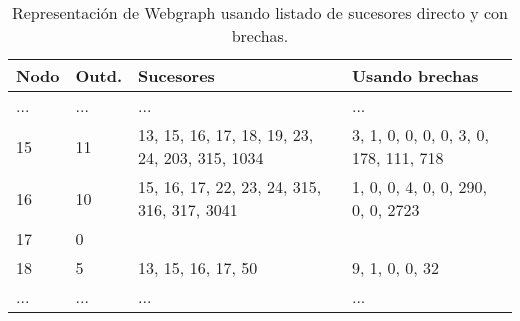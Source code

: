  \begin{table}[b]
\caption{Representación de Webgraph usando listado de sucesores directo y con brechas.}
\label{table:webgraph1}
\centering
\scriptsize

\begin{tabular}{|l|l|l|l|}
	\toprule
	Nodo & Outd. & Sucesores & Usando brechas \\
	\midrule
	... & ... & ... & ... \\
	15 & 11 & 13, 15, 16, 17, 18, 19, 23, 24, 203, 315, 1034 & 3, 1, 0, 0, 0, 0, 3, 0, 178, 111, 718 \\
	16 & 10 & 15, 16, 17, 22, 23, 24, 315, 316, 317, 3041 & 1, 0, 0, 4, 0, 0, 290, 0, 0, 2723 \\
	17 & 0 &  &  \\
	18 & 5 & 13, 15, 16, 17, 50 & 9, 1, 0, 0, 32 \\
	... & ... & ... & ... \\
\end{tabular}
\end{table} 
